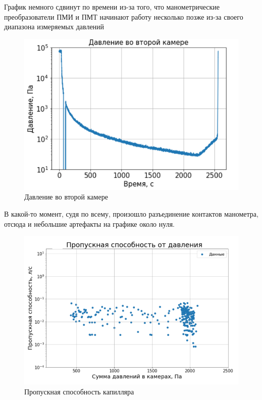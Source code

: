 \documentclass[a4paper,14pt]{extarticle}
\begin{document}
			График немного сдвинут по времени из-за того, что манометрические преобразователи ПМИ и ПМТ начинают работу несколько позже из-за своего диапазона измеряемых давлений 
			\begin{figure}[h!]
				\centering
				\includegraphics[width=.75\linewidth]{Screenshot_67.png}
				\caption{Давление во второй камере}
				\label{fig1}
			\end{figure}
			
			В какой-то момент, судя по всему, произошло разъединение контактов манометра, отсюда и небольшие артефакты на графике около нуля.
			
			\newpage
			\begin{figure}[h!]
				\centering
				\includegraphics[width=.75\linewidth]{lab1_9.png}
				\caption{Пропускная способность капилляра}
				\label{fig1}
			\end{figure}
		
\end{document}
